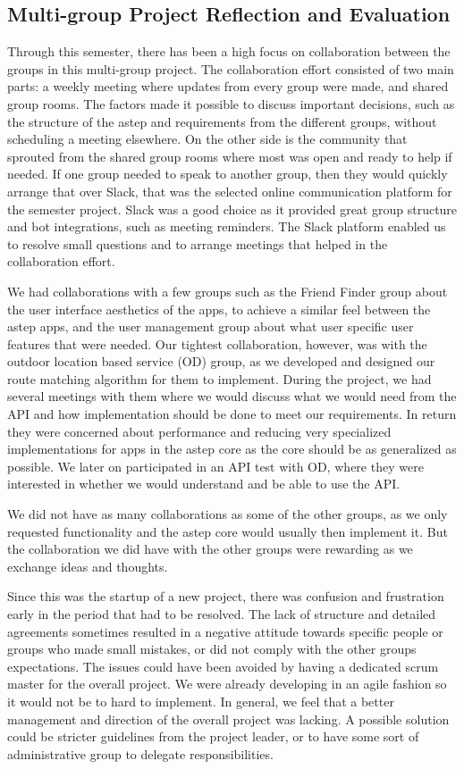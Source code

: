 \subsection{Multi-group Project Reflection and Evaluation}
Through this semester, there has been a high focus on collaboration between the groups in this multi-group project.
The collaboration effort consisted of two main parts: a weekly meeting where updates from every group were made, and shared group rooms.
The factors made it possible to discuss important decisions, such as the structure of the \gls{astep} and requirements from the different groups, without scheduling a meeting elsewhere.
On the other side is the community that sprouted from the shared group rooms where most was open and ready to help if needed.
If one group needed to speak to another group, then they would quickly arrange that over Slack, that was the selected online communication platform for the semester project.
Slack was a good choice as it provided great group structure and bot integrations, such as meeting reminders. 
The Slack platform enabled us to resolve small questions and to arrange meetings that helped in the collaboration effort.

We had collaborations with a few groups such as the Friend Finder group about the user interface aesthetics of the apps, to achieve a similar feel between the \gls{astep} apps, and the user management group about what user specific user features that were needed.
Our tightest collaboration, however, was with the outdoor location based service (OD) group, as we developed and designed our route matching algorithm for them to implement.
During the project, we had several meetings with them where we would discuss what we would need from the API and how implementation should be done to meet our requirements.
In return they were concerned about performance and reducing very specialized implementations for apps in the \gls{astep} core as the core should be as generalized as possible.
We later on participated in an API test with OD, where they were interested in whether we would understand and be able to use the API.

We did not have as many collaborations as some of the other groups, as we only requested functionality and the \gls{astep} core would usually then implement it.
But the collaboration we did have with the other groups were rewarding as we exchange ideas and thoughts.

Since this was the startup of a new project, there was confusion and frustration early in the period that had to be resolved.
The lack of structure and detailed agreements sometimes resulted in a negative attitude towards specific people or groups who made small mistakes, or did not comply with the other groups expectations.
The issues could have been avoided by having a dedicated scrum master for the overall project.
We were already developing in an agile fashion so it would not be to hard to implement.
In general, we feel that a better management and direction of the overall project was lacking.
A possible solution could be stricter guidelines from the project leader, or to have some sort of administrative group to delegate responsibilities.
